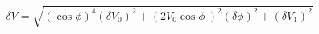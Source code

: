 \begin{equation}
\label{eq:delta_V_Malus}
\delta V = \sqrt{ \left(\cos{\phi}\right)^4(\delta V_0)^2 + \left(2V_0 \cos{\phi}\ \right)^2(\delta \phi)^2+ (\delta V_1)^2}
\end{equation}